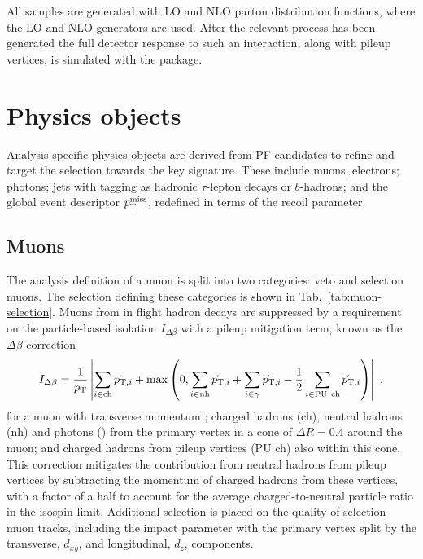 All samples are generated with \NNPDF \cite{Ball:2014uwa} LO and NLO parton distribution functions, where the LO and NLO generators are used. After the relevant process has been generated the full detector response to such an interaction, along with pileup vertices, is simulated with the \GEANT \cite{AGOSTINELLI2003250} package.


\section{Physics objects}

Analysis specific physics objects are derived from PF candidates to refine and target the selection towards the key signature. These include muons; electrons; photons; jets with tagging as hadronic $\tau$-lepton decays or $b$-hadrons; and the global event descriptor $p_{\text{T}}^{\mathrm{miss}}$, redefined in terms of the recoil parameter.

\subsection{Muons}

The analysis definition of a muon is split into two categories: veto and selection muons. The selection defining these categories is shown in Tab.~\ref{tab:muon-selection}. Muons from in flight hadron decays are suppressed by a requirement on the particle-based isolation $I_{\Delta\beta}$ with a pileup mitigation term, known as the $\Delta\beta$ correction
%
\begin{equation}
    I_{\Delta\beta} = \frac{1}{p_{\text{T}}}\left| \sum_{i\in\mathrm{ch}}\vec{p}_{\mathrm{T},i} + \max\left( 0, \sum_{i\in\mathrm{nh}}\vec{p}_{\mathrm{T},i} + \sum_{i\in\gamma}\vec{p}_{\mathrm{T},i} - \frac{1}{2}\sum_{i\in\mathrm{PU\ ch}}\vec{p}_{\mathrm{T},i} \right)\right|\ ,
\end{equation}
%
for a muon with transverse momentum \pt; charged hadrons (ch), neutral hadrons (nh) and photons (\Pgamma) from the primary vertex in a cone of $\Delta R=0.4$ around the muon; and charged hadrons from pileup vertices (PU ch) also within this cone. This correction mitigates the contribution from neutral hadrons from pileup vertices by subtracting the momentum of charged hadrons from these vertices, with a factor of a half to account for the average charged-to-neutral particle ratio in the isospin limit. Additional selection is placed on the quality of selection muon tracks, including the impact parameter with the primary vertex split by the transverse, $d_{xy}$, and longitudinal, $d_{z}$, components.

